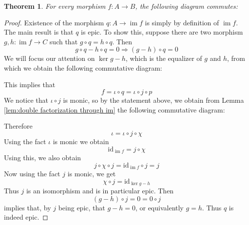 \documentclass{article}
\newcommand{\id}{\mathrm{id}}
\DeclareMathOperator{\im}{\mathrm{im}}
\DeclareMathOperator{\cok}{\mathrm{cok}}
\newtheorem{theorem}{Theorem}[section]
\begin{document}
\begin{theorem}\label{thm:map to im is epic}
    For every morphism $f:A\to B$, the following diagram commutes:
    \begin{center}
    \end{center}
        \cite{FIT}
\end{theorem}
\begin{proof}
Existence of the morphism $q: A\to \im f$ is simply by definition of $\im f$. The main result is that $q$ is epic. To show this, suppose there are two morphism $g,h:\im f\to C$ such that $g\circ q=h\circ q$. Then 
\[
g\circ q-h\circ q=0\Rightarrow (g-h)\circ q=0 
\]
We will focus our attention on $\ker g-h$, which is the equalizer of $g$ and $h$, from which we obtain the following commutative diagram:
\begin{center}
\end{center}
This implies that
\[
f=\iota \circ q=\iota \circ j\circ p
\]
We notice that $\iota \circ j$ is monic, so by the statement above, we obtain from Lemma \ref{lem:double factorization through im} the following commutative diagram:
\begin{center}
\end{center}
Therefore
\[
\iota=\iota \circ j\circ \chi
\]
Using the fact $\iota$ is monic we obtain
\[
\id_{\im f}=j\circ \chi
\]
Using this, we also obtain
\[
j\circ \chi\circ j=\id_{\im f}\circ j=j
\]
Now using the fact $j$ is monic, we get
\[
\chi \circ j=\id_{\ker g-h}
\]
Thus $j$ is an isomorphism and is in particular epic. Then
\[
(g-h)\circ j=0=0\circ j
\]
implies that, by $j$ being epic, that $g-h=0$, or equivalently $g=h$. Thus $q$ is indeed epic.
\end{proof}
\end{document}
